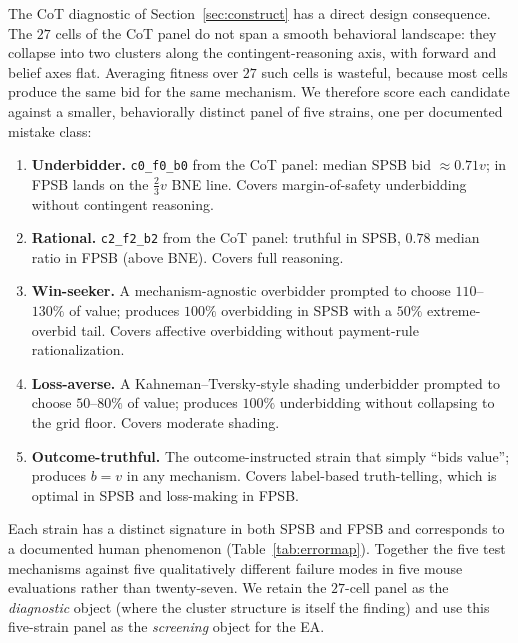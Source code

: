 \documentclass[12pt]{article}
\newcommand{\SPSB}{SPSB}
\begin{document}
The CoT diagnostic of Section~\ref{sec:construct} has a direct
design consequence. The $27$ cells of the CoT panel do not span a
smooth behavioral landscape: they collapse into two clusters along
the contingent-reasoning axis, with forward and belief axes flat.
Averaging fitness over $27$ such cells is wasteful, because most
cells produce the same bid for the same mechanism. We therefore
score each candidate against a smaller, behaviorally distinct panel
of five strains, one per documented mistake class:
\begin{enumerate}
\item \textbf{Underbidder.} \texttt{c0\_f0\_b0} from the CoT panel:
median \SPSB{} bid $\approx 0.71v$; in FPSB lands on the
$\tfrac{2}{3}v$ BNE line. Covers margin-of-safety underbidding
without contingent reasoning.
\item \textbf{Rational.} \texttt{c2\_f2\_b2} from the CoT panel:
truthful in \SPSB{}, $0.78$ median ratio in FPSB (above BNE).
Covers full reasoning.
\item \textbf{Win-seeker.} A mechanism-agnostic overbidder prompted
to choose $110$--$130\%$ of value; produces $100\%$ overbidding in
\SPSB{} with a $50\%$ extreme-overbid tail. Covers affective
overbidding without payment-rule rationalization.
\item \textbf{Loss-averse.} A Kahneman--Tversky-style shading
underbidder prompted to choose $50$--$80\%$ of value; produces
$100\%$ underbidding without collapsing to the grid floor. Covers
moderate shading.
\item \textbf{Outcome-truthful.} The outcome-instructed strain that
simply ``bids value''; produces $b{=}v$ in any mechanism. Covers
label-based truth-telling, which is optimal in \SPSB{} and
loss-making in FPSB.
\end{enumerate}
Each strain has a distinct signature in both \SPSB{} and FPSB and
corresponds to a documented human phenomenon (Table~\ref{tab:errormap}).
Together the five test mechanisms against five qualitatively
different failure modes in five mouse evaluations rather than
twenty-seven. We retain the $27$-cell panel as the \emph{diagnostic}
object (where the cluster structure is itself the finding) and use
this five-strain panel as the \emph{screening} object for the EA.
\end{document}
